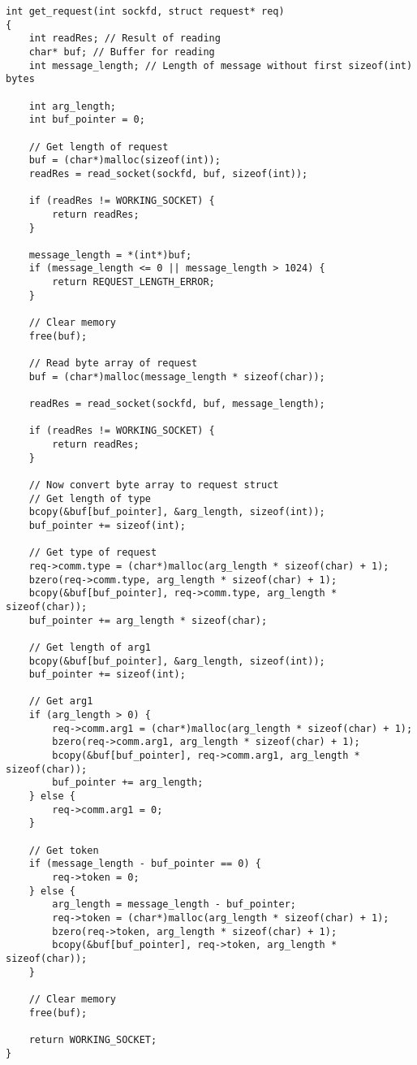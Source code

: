 \begin{lstlisting}
int get_request(int sockfd, struct request* req)
{
	int readRes; // Result of reading
	char* buf; // Buffer for reading
	int message_length; // Length of message without first sizeof(int) bytes

	int arg_length;
	int buf_pointer = 0;

	// Get length of request
	buf = (char*)malloc(sizeof(int));
	readRes = read_socket(sockfd, buf, sizeof(int));

	if (readRes != WORKING_SOCKET) {
		return readRes;
	}

	message_length = *(int*)buf;
	if (message_length <= 0 || message_length > 1024) {
		return REQUEST_LENGTH_ERROR;
	}

	// Clear memory
	free(buf);

	// Read byte array of request
	buf = (char*)malloc(message_length * sizeof(char));

	readRes = read_socket(sockfd, buf, message_length);

	if (readRes != WORKING_SOCKET) {
		return readRes;
	}

	// Now convert byte array to request struct
	// Get length of type
	bcopy(&buf[buf_pointer], &arg_length, sizeof(int));
	buf_pointer += sizeof(int);

	// Get type of request
	req->comm.type = (char*)malloc(arg_length * sizeof(char) + 1);
	bzero(req->comm.type, arg_length * sizeof(char) + 1);
	bcopy(&buf[buf_pointer], req->comm.type, arg_length * sizeof(char));
	buf_pointer += arg_length * sizeof(char);

	// Get length of arg1
	bcopy(&buf[buf_pointer], &arg_length, sizeof(int));
	buf_pointer += sizeof(int);

	// Get arg1
	if (arg_length > 0) {
		req->comm.arg1 = (char*)malloc(arg_length * sizeof(char) + 1);
		bzero(req->comm.arg1, arg_length * sizeof(char) + 1);
		bcopy(&buf[buf_pointer], req->comm.arg1, arg_length * sizeof(char));
		buf_pointer += arg_length;
	} else {
		req->comm.arg1 = 0;
	}

	// Get token
	if (message_length - buf_pointer == 0) {
		req->token = 0;
	} else {
		arg_length = message_length - buf_pointer;
		req->token = (char*)malloc(arg_length * sizeof(char) + 1);
		bzero(req->token, arg_length * sizeof(char) + 1);
		bcopy(&buf[buf_pointer], req->token, arg_length * sizeof(char));
	}

	// Clear memory
	free(buf);

	return WORKING_SOCKET;
}
\end{lstlisting}

